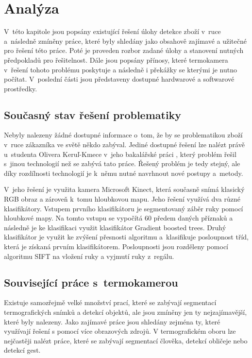\chapter{Analýza}
V~této kapitole jsou popsány existující řešení úlohy detekce zboží v~ruce a~následně zmíněny práce, které byly shledány jako obsahově zajímavé a užitečné pro řešení této práce. Poté je proveden rozbor zadané úlohy a stanovení nutných předpokladů pro řešitelnost. Dále jsou popsány přínosy, které termokamera v~řešení tohoto problému poskytuje a následně i překážky se kterými je nutno počítat. V~poslední části jsou představeny dostupné hardwarové a softwarové prostředky.

\section{Současný stav řešení problematiky} 
Nebyly nalezeny žádné dostupné informace o~tom, že by se problematikou zboží v~ruce zákazníka ve světě někdo zabýval. Jediné dostupné řešení lze nalézt právě u~studenta Olivera Keruľ-Kmece v~jeho bakalářské práci \cite{kerul2016detekce}, který problém řešil s~jinou technologií než se zabývá tato práce. Řešený problém je tedy stejný, ale díky rozdílnosti technologií je k~němu nutné navrhnout nové postupy a~metody.

V~jeho řešení je využita kamera Microsoft Kinect, která současně snímá klasický RGB obraz a zároveň k~tomu hloubkovou mapu. Jeho řešení využívá dva různé klasifikátory. Vstupem prvního klasifikátoru je segmentovaný záběr ruky pomocí hloubkové mapy. Na tomto vstupu se vypočítá 60 předem daných příznaků a následně je ke klasifikaci využit klasifikátor Gradient boosted trees. Druhý klasifikátor je využit ke zvýšení přesnosti algoritmu a~klasifikuje posloupnost tříd, která je získaná prvním klasifikátorem. Posloupnosti jsou rozděleny pomocí algoritmu SIFT na vložení ruky a vyjmutí ruky z~regálu.

\section{Související práce s~termokamerou}
    Existuje samozřejmě velké množství prací, které se zabývají segmentací termografických snímků a detekcí objektů, ale jsou zmíněny jen ty nejzajímavější, které byly nalezeny. Jako zajímavé práce jsou shledány zejména ty, které využívají řešení s pomocí více obrazových zdrojů. V termografickém oboru lze nejčastěji nalézt práce, které se zabývají segmentací člověka, detekcí obličeje nebo detekcí gest.
    
